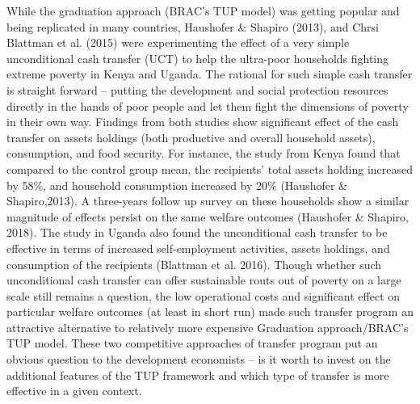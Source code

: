 \documentclass[]{article}
\begin{document}
While the graduation approach (BRAC's TUP model) was getting popular and
being replicated in many countries, Haushofer \& Shapiro (2013), and
Chrsi Blattman et al. (2015) were experimenting the effect of a very
simple unconditional cash transfer (UCT) to help the ultra-poor
households fighting extreme poverty in Kenya and Uganda. The rational
for such simple cash transfer is straight forward -- putting the
development and social protection resources directly in the hands of
poor people and let them fight the dimensions of poverty in their own
way. Findings from both studies show significant effect of the cash
transfer on assets holdings (both productive and overall household
assets), consumption, and food security. For instance, the study from
Kenya found that compared to the control group mean, the recipients'
total assets holding increased by 58\%, and household consumption
increased by 20\% (Haushofer \& Shapiro,2013). A three-years follow up
survey on these households show a similar magnitude of effects persist
on the same welfare outcomes (Haushofer \& Shapiro, 2018). The study in
Uganda also found the unconditional cash transfer to be effective in
terms of increased self-employment activities, assets holdings, and
consumption of the recipients (Blattman et al. 2016). Though whether
such unconditional cash transfer can offer sustainable routs out of
poverty on a large scale still remains a question, the low operational
costs and significant effect on particular welfare outcomes (at least in
short run) made such transfer program an attractive alternative to
relatively more expensive Graduation approach/BRAC's TUP model. These
two competitive approaches of transfer program put an obvious question
to the development economists -- is it worth to invest on the additional
features of the TUP framework and which type of transfer is more
effective in a given context.
\end{document}
